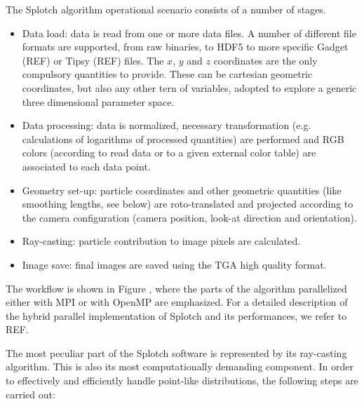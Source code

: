 \documentclass[11pt]{article}
\begin{document}
The Splotch algorithm operational scenario consists of a number of stages. 
\begin{itemize}
\item
Data load: data is read from one or more data files. A number of different file
formats are supported, from raw binaries, to HDF5 to more specific Gadget (REF) or Tipsy (REF)
files. The $x$, $y$ and $z$ coordinates are the only compulsory quantities to provide.
These can be cartesian geometric coordinates, but also any other tern 
of variables, adopted to explore a generic three dimensional parameter space.
\item
Data processing: data is normalized, necessary 
transformation (e.g. calculations of logarithms of processed quantities) are performed
and RGB colors (according to read data or to a given
external color table) are associated to each data point. 
\item
Geometry set-up: particle coordinates and other geometric quantities 
(like smoothing lengths, see below) are roto-translated and projected according to the 
camera configuration (camera position, look-at direction and orientation). 
\item
Ray-casting: particle contribution to image pixels are calculated.
\item
Image save: final images are saved using the TGA high quality format.
\end{itemize}
The workflow is shown in Figure , where the parts of the algorithm parallelized
either with MPI or with OpenMP are emphasized. For a detailed description of
the hybrid parallel implementation of Splotch and its performances, we refer to REF.


The most peculiar part of the Splotch software is represented by its ray-casting algorithm.
This is also its most computationally demanding component.
In order to effectively and efficiently handle point-like distributions, the following 
steps are carried out: 
\end{document}
